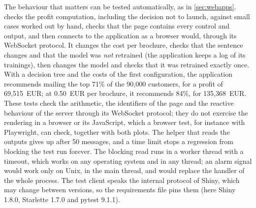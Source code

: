 The behaviour that matters can be tested automatically, as in \cref{sec:webapps}.  checks the profit
computation, including the decision not to launch, against small cases worked out by hand, checks that the page contains every control and output, and then connects to
the application as a browser would, through its WebSocket protocol. It changes the cost per brochure, checks that the sentence
changes and that the model was \emph{not} retrained (the application keeps a log of its trainings), then changes the model and checks
that it was retrained exactly once. With a decision tree and the costs of the first configuration, the application recommends mailing
the top 71\% of the 90,000 customers, for a profit of 69,515~EUR; at 0.50~EUR per brochure, it recommends 84\%, for 135,368~EUR. These tests
check the arithmetic, the identifiers of the page and the reactive behaviour of the server through its WebSocket
protocol; they do not exercise the rendering in a browser or its JavaScript, which a browser test, for instance
with Playwright, can check, together with both plots. The helper that reads the outputs gives up after 50 messages,
and a time limit stops a regression from blocking the test run forever. The blocking read runs in a worker thread with a
timeout, which works on any operating system and in any thread; an alarm signal would work only on Unix, in the main thread,
and would replace the handler of the whole process. The test client speaks the internal protocol of
Shiny, which may change between versions, so the requirements file pins them (here Shiny 1.8.0, Starlette 1.7.0 and
pytest 9.1.1).

